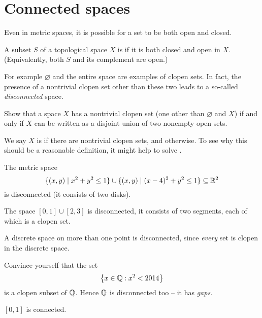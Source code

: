 \section{Connected spaces}
Even in metric spaces, it is possible for a set
to be both open and closed.
\begin{definition}
	A subset $S$ of a topological space $X$
	is  if it is both closed and open in $X$.
	(Equivalently, both $S$ and its complement are open.)
\end{definition}
For example $\varnothing$ and the entire space are examples of clopen sets.
In fact, the presence of a nontrivial clopen set other
than these two leads to a so-called \emph{disconnected} space.

\begin{ques}
	Show that a space $X$ has a nontrivial clopen set
	(one other than $\varnothing$ and $X$)
	if and only if $X$ can be written as a disjoint union
	of two nonempty open sets.
\end{ques}

We say $X$ is 
if there are nontrivial clopen sets,
and  otherwise.
To see why this should be a reasonable definition,
it might help to solve .

\begin{example}
	\listhack
	\begin{enumerate}[(a)]
		\ii The metric space 
		\[ \{ (x,y) \mid x^2+y^2\le 1 \}
			\cup \{ (x,y) \mid (x-4)^2+y^2\le1\} \subseteq \mathbb R^2 \]
		is disconnected (it consists of two disks).

		\ii The space $[0,1] \cup [2,3]$ is disconnected,
		it consists of two segments,
		each of which is a clopen set.

		\ii A discrete space on more than one point is disconnected,
		since \emph{every} set is clopen in the discrete space.

		\ii Convince yourself that the set
		\[ \left\{ x \in \mathbb Q : x^2 < 2014 \right\} \]
		is a clopen subset of $\mathbb Q$.
		Hence $\mathbb Q$ is disconnected too -- it has \emph{gaps}.

		\ii $[0,1]$ is connected.
	\end{enumerate}
\end{example}


